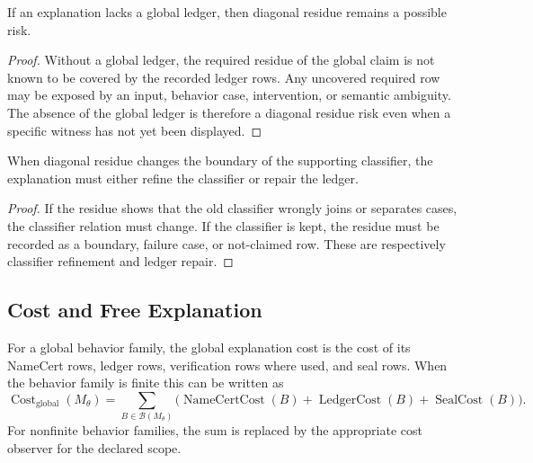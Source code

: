 \begin{theorem}
\label{thm:philosophy-non-global-ledgers-admit-diagonal-residue-risk}
If an explanation lacks a global ledger, then diagonal residue remains a
possible risk.
\end{theorem}
\begin{proof}
Without a global ledger, the required residue of the global claim is not
known to be covered by the recorded ledger rows. Any uncovered required
row may be exposed by an input, behavior case, intervention, or semantic
ambiguity. The absence of the global ledger is therefore a diagonal
residue risk even when a specific witness has not yet been displayed.
\end{proof}

\begin{theorem}
\label{thm:philosophy-diagonal-residue-forces-refinement-or-ledger-repair}
When diagonal residue changes the boundary of the supporting classifier,
the explanation must either refine the classifier or repair the ledger.
\end{theorem}
\begin{proof}
If the residue shows that the old classifier wrongly joins or separates
cases, the classifier relation must change. If the classifier is kept,
the residue must be recorded as a boundary, failure case, or not-claimed
row. These are respectively classifier refinement and ledger repair.
\end{proof}

\subsection{Cost and Free Explanation}
\label{subsec:philosophy-cost-free-explanation}

\begin{definition}
\label{def:philosophy-global-explanation-cost}
For a global behavior family, the global explanation cost is the cost of
its NameCert rows, ledger rows, verification rows where used, and seal
rows. When the behavior family is finite this can be written as
$$
\operatorname{Cost}_{\mathrm{global}}(M_\theta)
=
\sum_{B\in\mathcal B(M_\theta)}
\bigl(
\operatorname{NameCertCost}(B)
+
\operatorname{LedgerCost}(B)
+
\operatorname{SealCost}(B)
\bigr).
$$
For nonfinite behavior families, the sum is replaced by the appropriate
cost observer for the declared scope.
\end{definition}


